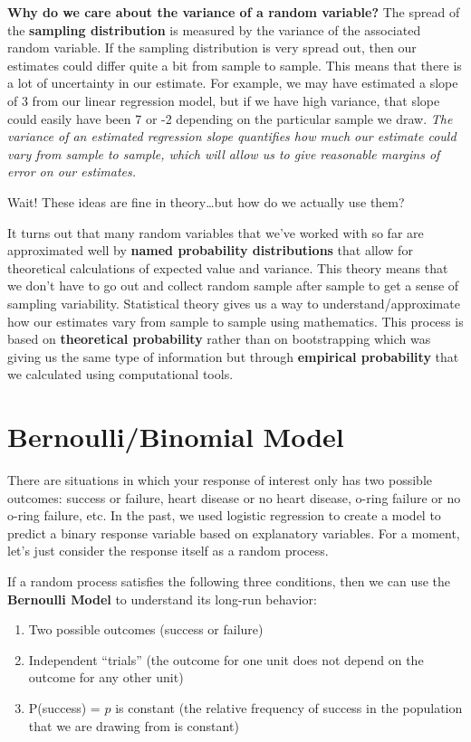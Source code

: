 \documentclass[
]{book}
\providecommand{\tightlist}{%
  \setlength{\itemsep}{0pt}\setlength{\parskip}{0pt}}
\begin{document}
\textbf{Why do we care about the variance of a random variable?} The spread of the \textbf{sampling distribution} is measured by the variance of the associated random variable. If the sampling distribution is very spread out, then our estimates could differ quite a bit from sample to sample. This means that there is a lot of uncertainty in our estimate. For example, we may have estimated a slope of 3 from our linear regression model, but if we have high variance, that slope could easily have been 7 or -2 depending on the particular sample we draw. \emph{The variance of an estimated regression slope quantifies how much our estimate could vary from sample to sample, which will allow us to give reasonable margins of error on our estimates.}

Wait! These ideas are fine in theory\ldots but how do we actually use them?

It turns out that many random variables that we've worked with so far are approximated well by \textbf{named probability distributions} that allow for theoretical calculations of expected value and variance. This theory means that we don't have to go out and collect random sample after sample to get a sense of sampling variability. Statistical theory gives us a way to understand/approximate how our estimates vary from sample to sample using mathematics. This process is based on \textbf{theoretical probability} rather than on bootstrapping which was giving us the same type of information but through \textbf{empirical probability} that we calculated using computational tools.

\hypertarget{bernoullibinomial-model}{%
\section{Bernoulli/Binomial Model}\label{bernoullibinomial-model}}

There are situations in which your response of interest only has two possible outcomes: success or failure, heart disease or no heart disease, o-ring failure or no o-ring failure, etc. In the past, we used logistic regression to create a model to predict a binary response variable based on explanatory variables. For a moment, let's just consider the response itself as a random process.

If a random process satisfies the following three conditions, then we can use the \textbf{Bernoulli Model} to understand its long-run behavior:

\begin{enumerate}
\def\labelenumi{\arabic{enumi}.}
\tightlist
\item
  Two possible outcomes (success or failure)
\item
  Independent ``trials'' (the outcome for one unit does not depend on the outcome for any other unit)
\item
  P(success) = \(p\) is constant (the relative frequency of success in the population that we are drawing from is constant)
\end{enumerate}
\end{document}
